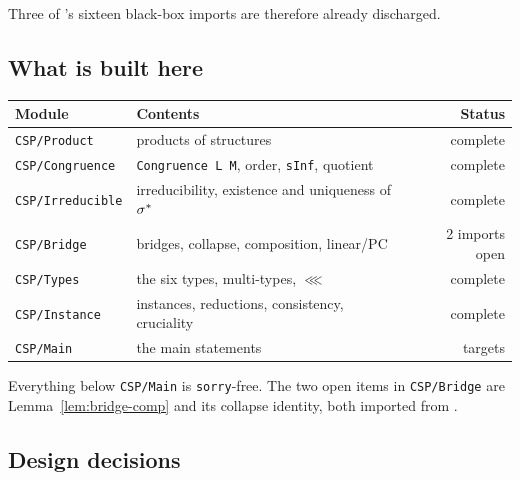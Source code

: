 Three of \cite{ZhukSimplified}'s sixteen black-box imports are therefore already
discharged.

\subsection{What is built here}\label{sec:built}

\begin{center}
\begin{tabular}{@{}llr@{}}
\hline
Module & Contents & Status \\
\hline
\texttt{CSP/Product} & products of structures & complete \\
\texttt{CSP/Congruence} & \texttt{Congruence L M}, order, \texttt{sInf}, quotient & complete \\
\texttt{CSP/Irreducible} & irreducibility, existence and uniqueness of $\sigma^{*}$ & complete \\
\texttt{CSP/Bridge} & bridges, collapse, composition, linear/PC & 2 imports open \\
\texttt{CSP/Types} & the six types, multi-types, $\lll$ & complete \\
\texttt{CSP/Instance} & instances, reductions, consistency, cruciality & complete \\
\texttt{CSP/Main} & the main statements & targets \\
\hline
\end{tabular}
\end{center}

Everything below \texttt{CSP/Main} is \texttt{sorry}-free. The two open items in
\texttt{CSP/Bridge} are Lemma~\ref{lem:bridge-comp} and its collapse identity,
both imported from \cite{ZhukJACM}.

\subsection{Design decisions}\label{sec:design}

